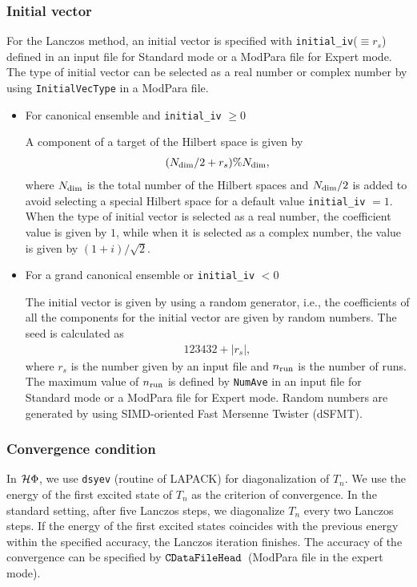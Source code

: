 \subsubsection*{Initial vector}
For the Lanczos method, an initial vector is specified with \verb|initial_iv|($\equiv r_s$) defined in an input file for Standard mode or a ModPara file for Expert mode. The type of initial vector can be selected as a real number or complex number by using \verb|InitialVecType| in a ModPara file.
\begin{itemize}
\item{For canonical ensemble and \verb|initial_iv| $\geq 0$}

A component of a target of the Hilbert space is given by
\begin{align}
(N_{\rm dim}/2 + r_s ) \% N_{\rm dim},
\end{align}
where $N_{\rm dim}$ is the total number of the Hilbert spaces and $N_{\rm dim}/2$ is added to avoid selecting a special Hilbert space for a default value \verb|initial_iv| $=1$.  When the type of initial vector is selected as a real number, the coefficient value is given by $1$, while when it is selected as a complex number, the value is given by $(1+i)/\sqrt{2}$.

\item{For a grand canonical ensemble or \verb|initial_iv| $< 0$}

The initial vector is given by using a random generator, i.e., the coefficients of all the components for the initial vector are given by random numbers. The seed is calculated as 
\begin{align}
123432+|r_s|,
\end{align}
where $r_s$ is the number given by an input file and $n_{\rm run}$ is the number of runs. The maximum value of $n_{\rm run}$ is defined by \verb|NumAve| in an input file for Standard mode or a ModPara file for Expert mode. Random numbers are generated by using SIMD-oriented Fast Mersenne Twister (dSFMT)\cite{Mutsuo2008}. 
\end{itemize}

\subsubsection*{Convergence condition}
In $\mathcal{H} \Phi$,
we use \verb|dsyev| (routine of LAPACK)
for diagonalization of $T_{n}$.
We use the energy of the first excited state of $T_{n}$
as the criterion of convergence. 
In the standard setting,
after five Lanczos steps,
we diagonalize $T_{n}$ every two Lanczos steps.
If the energy of the first excited states coincides with
the previous energy within the specified accuracy,
the Lanczos iteration finishes.
The accuracy of the convergence can be specified by 
$\verb|CDataFileHead|$~(ModPara file in the expert mode).

